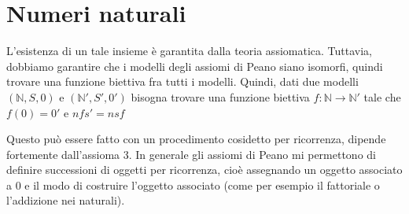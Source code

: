 \documentclass[a4paper]{article}
\begin{document}


\pagebreak

\section{Numeri naturali}


L'esistenza di un tale insieme è garantita dalla teoria assiomatica.
Tuttavia, dobbiamo garantire che i modelli degli assiomi di Peano siano isomorfi,
quindi trovare una funzione biettiva fra tutti i modelli.
Quindi, dati due modelli \((\mathbb{N}, S, 0)\) e \((\mathbb{N}', S', 0')\)
bisogna trovare una funzione biettiva \(f\colon \mathbb{N} \to \mathbb{N}'\)
tale che \(f(0) = 0'\) e \(nfs' = nsf\)

\begin{center}
\end{center}

Questo può essere fatto con un procedimento cosidetto per ricorrenza, dipende fortemente
dall'assioma 3. In generale gli assiomi di Peano mi permettono di definire successioni di oggetti
per ricorrenza, cioè assegnando un oggetto associato a \(0\)
e il modo di costruire l'oggetto associato (come per esempio il fattoriale o l'addizione nei naturali).
\end{document}
